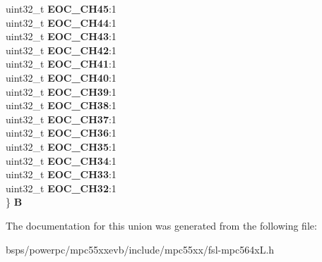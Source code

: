 \begin{DoxyCompactItemize}
\begin{tabbing}
\>uint32\_t {\bfseries EOC\_CH45}:1\\
\>uint32\_t {\bfseries EOC\_CH44}:1\\
\>uint32\_t {\bfseries EOC\_CH43}:1\\
\>uint32\_t {\bfseries EOC\_CH42}:1\\
\>uint32\_t {\bfseries EOC\_CH41}:1\\
\>uint32\_t {\bfseries EOC\_CH40}:1\\
\>uint32\_t {\bfseries EOC\_CH39}:1\\
\>uint32\_t {\bfseries EOC\_CH38}:1\\
\>uint32\_t {\bfseries EOC\_CH37}:1\\
\>uint32\_t {\bfseries EOC\_CH36}:1\\
\>uint32\_t {\bfseries EOC\_CH35}:1\\
\>uint32\_t {\bfseries EOC\_CH34}:1\\
\>uint32\_t {\bfseries EOC\_CH33}:1\\
\>uint32\_t {\bfseries EOC\_CH32}:1\\
\} {\bfseries B}\\

\end{tabbing}\end{DoxyCompactItemize}


The documentation for this union was generated from the following file\+:\begin{DoxyCompactItemize}
\item 
bsps/powerpc/mpc55xxevb/include/mpc55xx/fsl-\/mpc564x\+L.\+h\end{DoxyCompactItemize}
